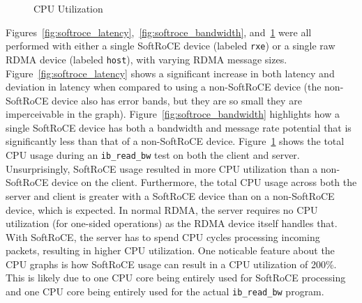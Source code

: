 \documentclass[12pt,titlepage]{article}
\begin{document}
\begin{figure}
	\centering
	\caption{CPU Utilization}%
	\label{fig:softroce_cpu}
\end{figure}

Figures~\ref{fig:softroce_latency},~\ref{fig:softroce_bandwidth}, and~\ref{fig:softroce_cpu} were all performed with either a single SoftRoCE device (labeled \texttt{rxe}) or a single raw RDMA device (labeled \texttt{host}), with varying RDMA message sizes.
Figure~\ref{fig:softroce_latency} shows a significant increase in both latency and deviation in latency when compared to using a non-SoftRoCE device (the non-SoftRoCE device also has error bands, but they are so small they are imperceivable in the graph).
Figure~\ref{fig:softroce_bandwidth} highlights how a single SoftRoCE device has both a bandwidth and message rate potential that is significantly less than that of a non-SoftRoCE device. 
Figure~\ref{fig:softroce_cpu} shows the total CPU usage during an \texttt{ib\_read\_bw} test on both the client and server. 
Unsurprisingly, SoftRoCE usage resulted in more CPU utilization than a non-SoftRoCE device on the client. 
Furthermore, the total CPU usage across both the server and client is greater with a SoftRoCE device than on a non-SoftRoCE device, which is expected.
In normal RDMA, the server requires no CPU utilization (for one-sided operations) as the RDMA device itself handles that.
With SoftRoCE, the server has to spend CPU cycles processing incoming packets, resulting in higher CPU utilization.
One noticable feature about the CPU graphs is how SoftRoCE usage can result in a CPU utilization of 200\%. 
This is likely due to one CPU core being entirely used for SoftRoCE processing and one CPU core being entirely used for the actual \texttt{ib\_read\_bw} program.
\end{document}
